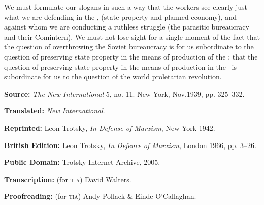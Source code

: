 We must formulate our slogans in such a way that the workers see clearly just what we are defending in the \USSR, (state property and planned economy), and against whom we are conducting a ruthless struggle (the parasitic bureaucracy and their Comintern). We must not lose sight for a single moment of the fact that the question of overthrowing the Soviet bureaucracy is for us subordinate to the question of preserving state property in the means of production of the \USSR: that the question of preserving state property in the means of production in the \USSR\ is subordinate for us to the question of the world proletarian revolution.


\newpage

\begin{letterinfo}
  \textbf{Source:} \emph{The New International} 5, no. 11. New York, Nov.\@ 1939, pp. 325--332.
	
  \textbf{Translated:} \emph{New International}.
	
  \textbf{Reprinted:} Leon Trotsky, \emph{In Defense of Marxism}, New York 1942.
	
  \textbf{British Edition:} Leon Trotsky, \emph{In Defence of Marxism}, London 1966, pp. 3--26.
	
  \textbf{Public Domain:} Trotsky Internet Archive, 2005.
	
  \textbf{Transcription:} (for \textsc{tia}) David Walters.
	
  \textbf{Proofreading:} (for \textsc{tia}) Andy Pollack \& Einde O’Callaghan.
\end{letterinfo}